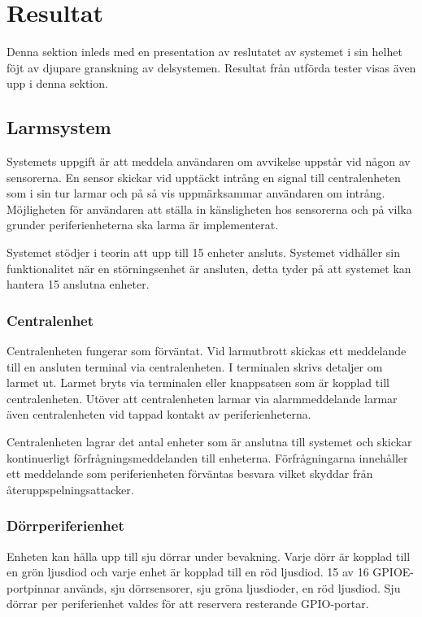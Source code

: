 \documentclass[a4paper]{article}
\newcommand{\todo}[1]{\marginpar{TODO: #1}\vspace{1cm}}
\begin{document}
\section{Resultat}
Denna sektion inleds med en presentation av reslutatet av systemet i sin helhet föjt av djupare granskning av delsystemen. Resultat från utförda tester visas även upp i denna sektion.

\subsection{Larmsystem}
Systemets uppgift är att meddela användaren om avvikelse uppstår vid någon av sensorerna. En sensor skickar vid upptäckt intrång en signal till centralenheten som i sin tur larmar och på så vis uppmärksammar användaren om intrång. Möjligheten för användaren att ställa in känsligheten hos sensorerna och på vilka grunder periferienheterna ska larma är implementerat.

Systemet stödjer i teorin att upp till 15 enheter ansluts. Systemet vidhåller sin funktionalitet när en störningsenhet är ansluten, detta tyder på att systemet kan hantera 15 anslutna enheter.

\subsubsection{Centralenhet}
Centralenheten fungerar som förväntat. Vid larmutbrott skickas ett meddelande till en ansluten terminal via centralenheten. I terminalen skrivs detaljer om larmet ut. Larmet bryts via terminalen eller knappsatsen som är kopplad till centralenheten. Utöver att centralenheten larmar via alarmmeddelande larmar även centralenheten vid tappad kontakt av periferienheterna.

Centralenheten lagrar det antal enheter som är anslutna till systemet och skickar kontinuerligt förfrågningsmeddelanden till enheterna. Förfrågningarna innehåller ett meddelande som periferienheten förväntas besvara vilket skyddar från återuppspelningsattacker.

\subsubsection{Dörrperiferienhet}
\todo{Motivera varför 7 dörrar används}
Enheten kan hålla upp till sju dörrar under bevakning. 
Varje dörr är kopplad till en grön ljusdiod och varje enhet är kopplad till en röd ljusdiod.
15 av 16 GPIOE-portpinnar används, sju dörrsensorer, sju gröna ljusdioder, en röd ljusdiod.
Sju dörrar per periferienhet valdes för att reservera resterande GPIO-portar.
\end{document}
